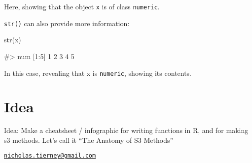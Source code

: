 Here, showing that the object \texttt{x} is of class \texttt{numeric}.

\texttt{str()} can also provide more information:

\begin{Schunk}
\begin{Sinput}
str(x)
\end{Sinput}
\begin{Soutput}
#>  num [1:5] 1 2 3 4 5
\end{Soutput}
\end{Schunk}

In this case, revealing that x is \texttt{numeric}, showing its
contents.

\section{Idea}\label{idea}

Idea: Make a cheatsheet / infographic for writing functions in R, and
for making s3 methods. Let's call it ``The Anatomy of S3 Methods''

\address{%
Nicholas Tierney\\
Queensland University of Technology\\
Level 8, Y Block, Main Drive, QUT, Brisbane, Australia\\
}
\href{mailto:nicholas.tierney@gmail.com}{\nolinkurl{nicholas.tierney@gmail.com}}

